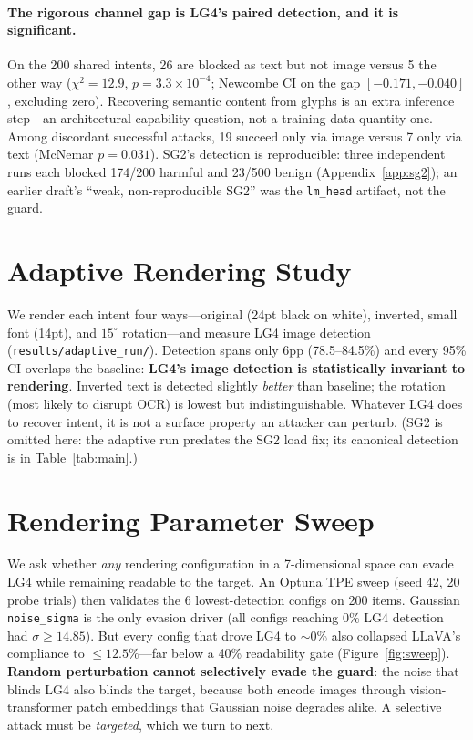 \documentclass[11pt]{article}
\begin{document}
\paragraph{The rigorous channel gap is LG4's paired detection, and it is significant.} On the 200 shared intents, 26 are blocked as text but not image versus 5 the other way ($\chi^2{=}12.9$, $p{=}3.3\times10^{-4}$; Newcombe CI on the gap $[-0.171,-0.040]$, excluding zero). Recovering semantic content from glyphs is an extra inference step---an architectural capability question, not a training-data-quantity one. Among discordant successful attacks, 19 succeed only via image versus 7 only via text (McNemar $p{=}0.031$). SG2's detection is reproducible: three independent runs each blocked 174/200 harmful and 23/500 benign (Appendix~\ref{app:sg2}); an earlier draft's ``weak, non-reproducible SG2'' was the \texttt{lm\_head} artifact, not the guard.

\section{Adaptive Rendering Study}

We render each intent four ways---original (24pt black on white), inverted, small font (14pt), and $15^\circ$ rotation---and measure LG4 image detection (\texttt{results/adaptive\_run/}). Detection spans only 6pp (78.5--84.5\%) and every 95\% CI overlaps the baseline: \textbf{LG4's image detection is statistically invariant to rendering}. Inverted text is detected slightly \emph{better} than baseline; the rotation (most likely to disrupt OCR) is lowest but indistinguishable. Whatever LG4 does to recover intent, it is not a surface property an attacker can perturb. (SG2 is omitted here: the adaptive run predates the SG2 load fix; its canonical detection is in Table~\ref{tab:main}.)

\section{Rendering Parameter Sweep}

We ask whether \emph{any} rendering configuration in a 7-dimensional space can evade LG4 while remaining readable to the target. An Optuna TPE sweep (seed 42, 20 probe trials) then validates the 6 lowest-detection configs on 200 items. Gaussian \texttt{noise\_sigma} is the only evasion driver (all configs reaching 0\% LG4 detection had $\sigma\geq14.85$). But every config that drove LG4 to $\sim$0\% also collapsed LLaVA's compliance to $\leq12.5\%$---far below a 40\% readability gate (Figure~\ref{fig:sweep}). \textbf{Random perturbation cannot selectively evade the guard}: the noise that blinds LG4 also blinds the target, because both encode images through vision-transformer patch embeddings that Gaussian noise degrades alike. A selective attack must be \emph{targeted}, which we turn to next.
\end{document}
